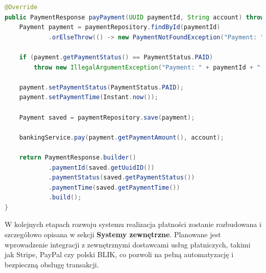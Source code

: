\begin{lstlisting}[language=Java, style=JavaStyle, caption=Fragment metody \texttt{payPayment}]
@Override
public PaymentResponse payPayment(UUID paymentId, String account) throws PaymentNotFoundException {
    Payment payment = paymentRepository.findById(paymentId)
            .orElseThrow(() -> new PaymentNotFoundException("Payment: " + paymentId + " not found"));

    if (payment.getPaymentStatus() == PaymentStatus.PAID)
        throw new IllegalArgumentException("Payment: " + paymentId + " already paid");

    payment.setPaymentStatus(PaymentStatus.PAID);
    payment.setPaymentTime(Instant.now());

    Payment saved = paymentRepository.save(payment);

    bankingService.pay(payment.getPaymentAmount(), account);

    return PaymentResponse.builder()
            .paymentId(saved.getUuidID())
            .paymentStatus(saved.getPaymentStatus())
            .paymentTime(saved.getPaymentTime())
            .build();
}
\end{lstlisting}

W kolejnych etapach rozwoju systemu realizacja płatności zostanie rozbudowana i szczegółowo opisana w sekcji \textbf{Systemy zewnętrzne}. Planowane jest wprowadzenie integracji z zewnętrznymi dostawcami usług płatniczych, takimi jak Stripe, PayPal czy polski BLIK, co pozwoli na pełną automatyzację i bezpieczną obsługę transakcji.

